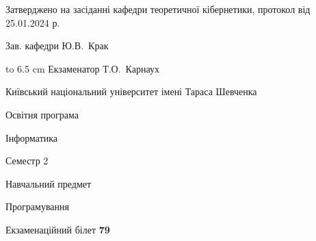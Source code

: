 \documentclass[12pt, ukrainian]{article}
\begin{document}
{\smallskip\smallskip \begin {scriptsize} Затверджено на засіданні кафедри теоретичної кібернетики, протокол   від   25.01.2024 р.\par\smallskip\smallskip\smallskip\smallskip
{\parbox {6.5 cm} {Зав. кафедри \dotfill Ю.В.~Крак}}\hspace {0.7cm} {\hbox to 6.5 cm { Екзаменатор \dotfill Т.О.~Карнаух}} \end{scriptsize}}
\newpage
{{\begin {scriptsize}\par
{ \center  Київський національний університет імені Тараса Шевченка \par}
{\parbox {5 cm}{Освітня програма \hfill}{\parbox {7 cm}{Інформатика\hfill}}\parbox {6 cm}{\hfill Семестр 2}}\par
{\parbox {5 cm} {Навчальний предмет \hfill}\parbox {7 cm}{Програмування \hfill}\parbox {6cm}{\hfill}\par}\vspace{-15pt} \end{scriptsize}}{\center Екзаменаційний білет \No \textbf { 79 }\par}}
\end{document}
